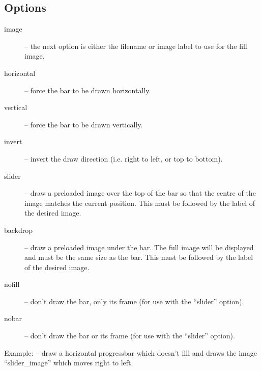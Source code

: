 \subsection{Options}
\begin{description}
  \item[image] -- the next option is either the filename or image label to
    use for the fill image.
  \item[horizontal] -- force the bar to be drawn horizontally.
  \item[vertical] -- force the bar to be drawn vertically.
  \item[invert] -- invert the draw direction (i.e. right to left, or top to
    bottom).
  \item[slider] -- draw a preloaded image over the top of the bar so that
    the centre of the image matches the current position. This must be
    followed by the label of the desired image.
  \item[backdrop] -- draw a preloaded image under the bar. The full
    image will be displayed and must be the same size as the bar. 
    This must be followed by the label of the desired image.
  \item[nofill] -- don't draw the bar, only its frame (for use with the
     ``slider'' option).
  \item[nobar] -- don't draw the bar or its frame (for use with the
    ``slider'' option).
\end{description}

Example:  -- draw
a horizontal progressbar which doesn't fill and draws the image
``slider\_image'' which moves right to left.


